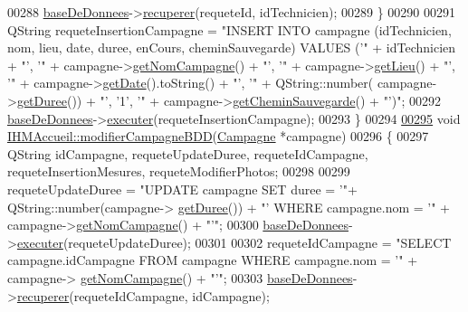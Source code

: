 \begin{DoxyCode}
{00288         \hyperlink{class_i_h_m_accueil_ab56d9846c071396a92f88272880e2c1f}{baseDeDonnees}->\hyperlink{class_base_de_donnees_a77539baad389f5acf754cd2cd452403e}{recuperer}(requeteId, idTechnicien);
00289     \}
00290 
00291     QString requeteInsertionCampagne = \textcolor{stringliteral}{"INSERT INTO campagne (idTechnicien, nom, lieu, date, duree,
       enCours, cheminSauvegarde) VALUES ('"} + idTechnicien + \textcolor{stringliteral}{"', '"} + campagne->\hyperlink{class_campagne_a99a682fcb8e5a3f8c2aff7a44eb2c930}{getNomCampagne}() + \textcolor{stringliteral}{"', '"} +
       campagne->\hyperlink{class_campagne_a98d71a731d16dec7a882787387b29d8e}{getLieu}() + \textcolor{stringliteral}{"', '"} + campagne->\hyperlink{class_campagne_a319b5bb4ed2b0fc1a10fc4d099a7a6d2}{getDate}().toString() + \textcolor{stringliteral}{"', '"} + QString::number(
      campagne->\hyperlink{class_campagne_abe02a9050f4a5ea9521dd40b855c350b}{getDuree}()) + \textcolor{stringliteral}{"', '1', '"} + campagne->\hyperlink{class_campagne_ad752790357417d83a93056d9c9689a16}{getCheminSauvegarde}() + \textcolor{stringliteral}{"')"};
00292     \hyperlink{class_i_h_m_accueil_ab56d9846c071396a92f88272880e2c1f}{baseDeDonnees}->\hyperlink{class_base_de_donnees_aa8de5f8f8bb17edc43f5c0ee33712081}{executer}(requeteInsertionCampagne);
00293 \}
00294 
\hyperlink{class_i_h_m_accueil_a7f1e5f71843a99cb44e3efb7191a6d07}{00295} \textcolor{keywordtype}{void} \hyperlink{class_i_h_m_accueil_a7f1e5f71843a99cb44e3efb7191a6d07}{IHMAccueil::modifierCampagneBDD}(\hyperlink{class_campagne}{Campagne} *campagne)
00296 \{
00297     QString idCampagne, requeteUpdateDuree, requeteIdCampagne, requeteInsertionMesures, 
      requeteModifierPhotos;
00298 
00299     requeteUpdateDuree = \textcolor{stringliteral}{"UPDATE campagne SET duree = '"}+ QString::number(campagne->
      \hyperlink{class_campagne_abe02a9050f4a5ea9521dd40b855c350b}{getDuree}()) + \textcolor{stringliteral}{"' WHERE campagne.nom = '"} + campagne->\hyperlink{class_campagne_a99a682fcb8e5a3f8c2aff7a44eb2c930}{getNomCampagne}() + \textcolor{stringliteral}{"'"};
00300     \hyperlink{class_i_h_m_accueil_ab56d9846c071396a92f88272880e2c1f}{baseDeDonnees}->\hyperlink{class_base_de_donnees_aa8de5f8f8bb17edc43f5c0ee33712081}{executer}(requeteUpdateDuree);
00301 
00302     requeteIdCampagne = \textcolor{stringliteral}{"SELECT campagne.idCampagne FROM campagne WHERE campagne.nom = '"} + campagne->
      \hyperlink{class_campagne_a99a682fcb8e5a3f8c2aff7a44eb2c930}{getNomCampagne}() + \textcolor{stringliteral}{"'"};
00303     \hyperlink{class_i_h_m_accueil_ab56d9846c071396a92f88272880e2c1f}{baseDeDonnees}->\hyperlink{class_base_de_donnees_a77539baad389f5acf754cd2cd452403e}{recuperer}(requeteIdCampagne, idCampagne);
}
\end{DoxyCode}
